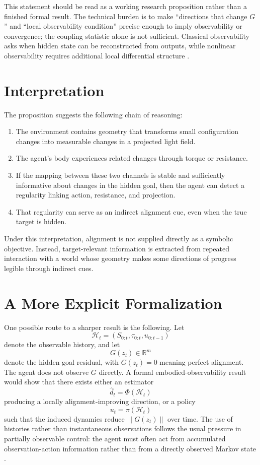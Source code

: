 \documentclass[11pt]{article}
\begin{document}
This statement should be read as a working research proposition rather than a finished formal result. The technical burden is to make ``directions that change $G$'' and ``local observability condition'' precise enough to imply observability or convergence; the coupling statistic alone is not sufficient. Classical observability asks when hidden state can be reconstructed from outputs, while nonlinear observability requires additional local differential structure \cite{kalman1960,hermann1977}.

\section{Interpretation}

The proposition suggests the following chain of reasoning:

\begin{enumerate}
    \item The environment contains geometry that transforms small configuration changes into measurable changes in a projected light field.
    \item The agent's body experiences related changes through torque or resistance.
    \item If the mapping between these two channels is stable and sufficiently informative about changes in the hidden goal, then the agent can detect a regularity linking action, resistance, and projection.
    \item That regularity can serve as an indirect alignment cue, even when the true target is hidden.
\end{enumerate}

Under this interpretation, alignment is not supplied directly as a symbolic objective. Instead, target-relevant information is extracted from repeated interaction with a world whose geometry makes some directions of progress legible through indirect cues.

\section{A More Explicit Formalization}

One possible route to a sharper result is the following. Let
\[
\mathcal{H}_t = (S_{0:t},\tau_{0:t},u_{0:t-1})
\]
denote the observable history, and let
\[
G(z_t) \in \mathbb{R}^m
\]
denote the hidden goal residual, with $G(z_t)=0$ meaning perfect alignment. The agent does not observe $G$ directly. A formal embodied-observability result would show that there exists either an estimator
\[
\hat d_t = \Phi(\mathcal{H}_t)
\]
producing a locally alignment-improving direction, or a policy
\[
u_t = \pi(\mathcal{H}_t)
\]
such that the induced dynamics reduce $\lVert G(z_t) \rVert$ over time. The use of histories rather than instantaneous observations follows the usual pressure in partially observable control: the agent must often act from accumulated observation-action information rather than from a directly observed Markov state \cite{kaelbling1998}.
\end{document}
